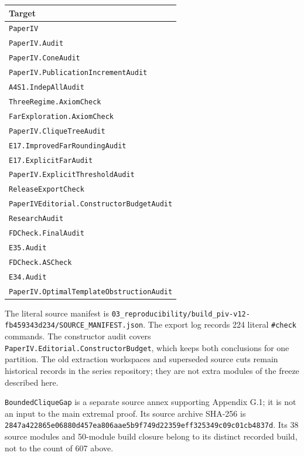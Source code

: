 \documentclass[english,11pt,a4paper]{article}
\newcounter{none}
\begin{document}
{\def\LTcaptype{none} %
\begin{longtable}[]{@{}l@{}}
\toprule\noalign{}
Target \\
\midrule\noalign{}
\endhead
\bottomrule\noalign{}
\endlastfoot
\nolinkurl{PaperIV} \\
\nolinkurl{PaperIV.Audit} \\
\nolinkurl{PaperIV.ConeAudit} \\
\nolinkurl{PaperIV.PublicationIncrementAudit} \\
\nolinkurl{A4S1.IndepAllAudit} \\
\nolinkurl{ThreeRegime.AxiomCheck} \\
\nolinkurl{FarExploration.AxiomCheck} \\
\nolinkurl{PaperIV.CliqueTreeAudit} \\
\nolinkurl{E17.ImprovedFarRoundingAudit} \\
\nolinkurl{E17.ExplicitFarAudit} \\
\nolinkurl{PaperIV.ExplicitThresholdAudit} \\
\nolinkurl{ReleaseExportCheck} \\
\nolinkurl{PaperIVEditorial.ConstructorBudgetAudit} \\
\nolinkurl{ResearchAudit} \\
\nolinkurl{FDCheck.FinalAudit} \\
\nolinkurl{E35.Audit} \\
\nolinkurl{FDCheck.ASCheck} \\
\nolinkurl{E34.Audit} \\
\nolinkurl{PaperIV.OptimalTemplateObstructionAudit} \\
\end{longtable}
}

The literal source manifest is
\nolinkurl{03_reproducibility/build_piv-v12-fb459343d234/SOURCE_MANIFEST.json}.
The export log records 224 literal \nolinkurl{#check} commands. The
constructor audit covers \nolinkurl{PaperIV.Editorial.ConstructorBudget},
which keeps both conclusions for one partition. The old extraction
workspaces and superseded source cuts remain historical records in the
series repository; they are not extra modules of the freeze described
here.

\nolinkurl{BoundedCliqueGap} is a separate source annex supporting Appendix
G.1; it is not an input to the main extremal proof. Its source archive
SHA-256 is
\nolinkurl{2847a422865e06880d457ea806aae5b9f749d22359eff325349c09c01cb4837d}.
Its 38 source modules and 50-module build closure belong to its distinct
recorded build, not to the count of 607 above.
\end{document}
